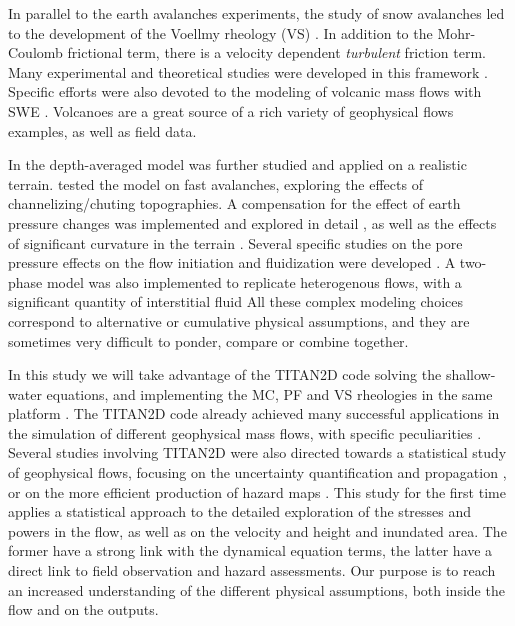 \documentclass{article}
\begin{document}
In parallel to the earth avalanches experiments, the study of snow avalanches led to the development of the Voellmy rheology (VS) \citep{Voellmy1955, Bartelt1999, Salm1990, Salm1993, BarteltMcArdell2009}.  In addition to the Mohr-Coulomb frictional term, there is a velocity dependent \emph{turbulent} friction term. Many experimental and theoretical studies were developed in this framework \citep{Gruber2007, Kern2009, Christen2010, Fischer2012}. Specific efforts were also devoted to the modeling of volcanic mass flows with SWE \citep{FreundtBursik1998,Saucedo2005, Kelfoun2005,Kelfoun2009,Procter2010,Kelfoun2011}. Volcanoes are a great source of a rich variety of geophysical flows examples, as well as field data.

In \cite{Iverson1997, Iverson2001, Denlinger2001, Denlinger2004, Iverson2004} the depth-averaged model was further studied and applied on a realistic terrain. \cite{Wieland1999, Gray1999, Gray2003} tested the model on fast avalanches, exploring the effects of channelizing/chuting topographies. A compensation for the effect of earth pressure changes was implemented and explored in detail \citep{Pirulli2007,Pirulli2008}, as well as the effects of significant curvature in the terrain \citep{Greve1994, PudasainiHutter2003, Fischer2012}. Several specific studies on the pore pressure effects on the flow initiation and fluidization were developed \citep{SavageIverson2003, Iordanoff2004, Iverson2014}. A two-phase model was also implemented to replicate heterogenous flows, with a significant quantity of interstitial fluid \citep{PitmanLe2005} All these complex modeling choices correspond to alternative or cumulative physical assumptions, and they are sometimes very difficult to ponder, compare or combine together.

In this study we will take advantage of the TITAN2D code solving the shallow-water equations, and implementing the MC, PF and VS rheologies in the same platform \citep{Pitman2003a, Patra2005, Patra2006, Yu2009, Aghakhani2016}. The TITAN2D code already achieved many successful applications in the simulation of different geophysical mass flows, with specific peculiarities \citep{Rupp2004, Sheridan2005,Rupp2006, Procter2010, Sheridan2010, Capra2011, Charbonnier2015}. Several studies involving TITAN2D were also directed towards a statistical study of geophysical flows, focusing on the uncertainty quantification and propagation \citep{Dalbey2008, Dalbey2009, Stefanescu2012a, Stefanescu2012b}, or on the more efficient production of hazard maps \citep{Bayarri2009, Spiller2014,Bayarri2015, Ogburn2016}. This study for the first time applies a statistical approach to the detailed exploration of the stresses and powers in the flow, as well as on the velocity and height and inundated area. The former have a strong link with the dynamical equation terms, the latter have a direct link to field observation and hazard assessments. Our purpose is to reach an increased understanding of the different physical assumptions, both inside the flow and on the outputs.
\end{document}
